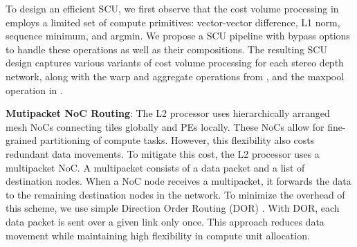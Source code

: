 To design an efficient SCU, we first observe that the cost volume processing in \cite{stereonet, hitnet, tiefenrausch} employs a limited set of compute primitives: vector-vector difference, L1 norm, sequence minimum, and argmin.
We propose a SCU pipeline with bypass options to handle these operations as well as their compositions.
The resulting SCU design captures various variants of cost volume processing for each stereo depth network, along with the warp and aggregate operations from \cite{hitnet}, and the maxpool operation in \cite{redmon_yolov3_2018}. 

\textbf{Mutipacket NoC Routing}: 
The \projname{} L2 processor uses hierarchically arranged mesh NoCs connecting tiles globally and PEs locally.
These NoCs allow for fine-grained partitioning of compute tasks. 
However, this flexibility also costs redundant data movements.
To mitigate this cost, the \projname{} L2 processor uses a multipacket NoC. %
A multipacket consists of a data packet and a list of destination nodes. 
When a NoC node receives a multipacket, it forwards the data to the remaining destination nodes in the network.
To minimize the overhead of this scheme, we use simple Direction Order Routing (DOR) \cite{eecs570_dor}.
With DOR, each data packet is sent over a given link only once.
This approach reduces data movement while maintaining high flexibility in compute unit allocation.

